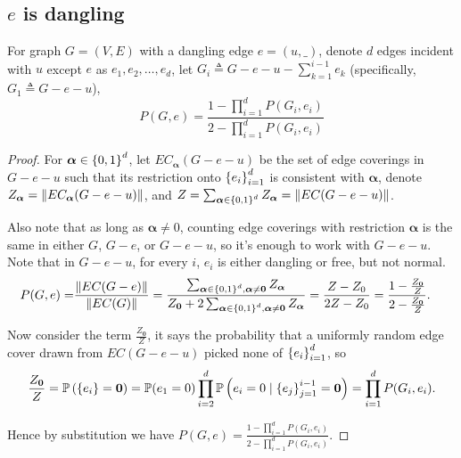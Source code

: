 \subsection{$e$ is dangling}
\begin{Lem}
For graph $G=(V,E)$ with a dangling edge $e=(u,\_)$, denote $d$
edges incident with $u$ except $e$ as $e_1, e_2, \ldots, e_d$,
let $G_i \triangleq G - e - u - \sum_{k=1}^{i-1} e_k$ (specifically, $G_1 \triangleq G - e - u$),
	\begin{equation}
		P(G, e) = \frac{1-\prod_{i=1}^d P(G_i, e_i)}{2 - \prod_{i=1}^d P(G_i, e_i)} %
		\label{propp3rg}
	\end{equation}
\end{Lem}
\begin{proof}
	For $\boldsymbol\alpha \in \left\{0,1\right\}^d$, let $EC_{\boldsymbol\alpha}(G-e-u)$ be the set of edge coverings in $G-e-u$ such that its restriction onto $\left\{e_i\right\}_{i=1}^{d}$ is consistent with $\boldsymbol\alpha$, denote $Z_{\boldsymbol\alpha} = \left\Vert EC_{\boldsymbol\alpha}(G-e-u)\right\Vert$, and $Z = \sum_{\boldsymbol\alpha \in \left\{0,1\right\}^d} Z_{\boldsymbol\alpha} = \left\Vert EC(G-e-u)\right\Vert$. %

		Also note that as long as $\boldsymbol\alpha \neq 0$, counting edge coverings with restriction $\boldsymbol\alpha$ is the same in either $G$, $G-e$, or $G-e-u$, so it's enough to work with $G-e-u$. Note that in $G-e-u$, for every $i$, $e_i$ is either dangling or free, but not normal.
	\begin{align*}
		P(G,e) = & \frac{\left\Vert EC(G-e)\right\Vert}{\left\Vert EC(G)\right\Vert}
		= \frac{\sum_{\boldsymbol\alpha \in \left\{0,1\right\}^d, \boldsymbol\alpha \neq \mathbf{0}} Z_{\boldsymbol\alpha} }{ Z_{\mathbf{0}} + 2 \sum_{\boldsymbol\alpha \in \left\{0,1\right\}^d, \boldsymbol\alpha \neq \mathbf{0}} Z_{\boldsymbol\alpha}}
		=\frac{Z - Z_0}{2 Z - Z_0}
		= \frac{1 - \frac{Z_{\mathbf{0}}}{Z}}{ 2 - \frac{Z_{\mathbf{0}}}{Z}}.
	\end{align*}

	Now consider the term $\frac{Z_{\mathbf{0}}}{Z}$, it says the probability that a uniformly random edge cover drawn from $EC(G-e-u)$ picked none of $\left\{e_i\right\}_{i=1}^{d}$, so
	\begin{align*}
		\frac{Z_{\mathbf{0}}}{Z}=\mathbb{P} \left( \left\{e_i\right\} = \mathbf{0}\right) = \mathbb{P} (e_1 = 0) \prod_{i=2}^d \mathbb{P} \left(e_i = 0 \mid \left\{e_j\right\}_{j=1}^{i-1} = \mathbf{0}\right) = \prod_{i=1}^d P(G_i, e_i).
	\end{align*}

	Hence by substitution we have $P(G, e) = \frac{1-\prod_{i=1}^d P(G_i, e_i)}{2 - \prod_{i=1}^d P(G_i, e_i)}$.
	
\end{proof}

